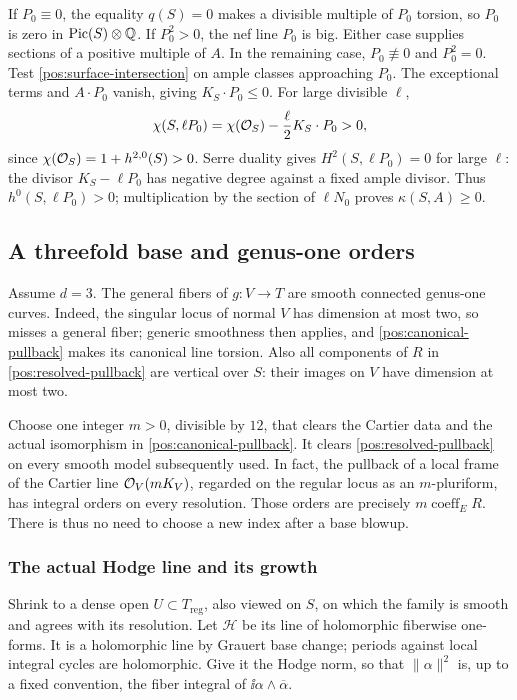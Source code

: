 If \(P_0\equiv0\), the equality \(q(S)=0\) makes a divisible
multiple of \(P_0\) torsion, so \(P_0\) is zero in
\(\operatorname{Pic}(S)\otimes\mathbb{Q}\). If \(P_0^2>0\), the nef line \(P_0\) is
big. Either case supplies sections of a positive multiple of \(A\).
In the remaining case, \(P_0\not\equiv0\) and \(P_0^2=0\).
Test \eqref{pos:surface-intersection} on ample classes approaching
\(P_0\). The exceptional terms and \(A\cdot P_0\) vanish, giving
\(K_S\cdot P_0\leq0\). For large divisible \(\ell\),
\begin{equation}\label{pos:surface-riemann-roch}
 \chi(S,\ell P_0)
 =\chi(\mathcal{O}_S)-\frac{\ell}{2}K_S\cdot P_0>0,
\end{equation}
since \(\chi(\mathcal{O}_S)=1+h^{2,0}(S)>0\). Serre duality gives
\(H^2(S,\ell P_0)=0\) for large \(\ell\): the divisor
\(K_S-\ell P_0\) has negative degree against a fixed ample divisor.
Thus \(h^0(S,\ell P_0)>0\); multiplication by the section of
\(\ell N_0\) proves \(\kappa(S,A)\geq0\).

\subsection{A threefold base and genus-one orders}

Assume \(d=3\). The general fibers of \(g:V\to T\) are smooth
connected genus-one curves. Indeed, the singular locus of normal
\(V\) has dimension at most two, so misses a general fiber; generic
smoothness then applies, and \eqref{pos:canonical-pullback} makes its
canonical line torsion. Also all components of \(R\) in
\eqref{pos:resolved-pullback} are vertical over \(S\): their images
on \(V\) have dimension at most two.

Choose one integer \(m>0\), divisible by \(12\), that clears the
Cartier data and the actual isomorphism in
\eqref{pos:canonical-pullback}. It clears
\eqref{pos:resolved-pullback} on every smooth model subsequently
used. In fact, the pullback of a local frame of the Cartier line
\(\mathcal{O}_V(mK_V)\), regarded on the regular locus as an
\(m\)-pluriform, has integral orders on every resolution. Those
orders are precisely \(m\operatorname{coeff}_E R\). There is thus
no need to choose a new index after a base blowup.

\subsubsection{The actual Hodge line and its growth}

Shrink to a dense open \(U\subset T_{\mathrm{reg}}\), also viewed
on \(S\), on which the family is smooth and agrees with its resolution.
Let \(\mathcal H\) be its line of holomorphic fiberwise one-forms.
It is a holomorphic line by Grauert base change; periods against local
integral cycles are holomorphic. Give it the Hodge norm, so that
\(\|\alpha\|^2\) is, up to a fixed convention, the fiber integral
of \(\ii\alpha\wedge\overline\alpha\).

